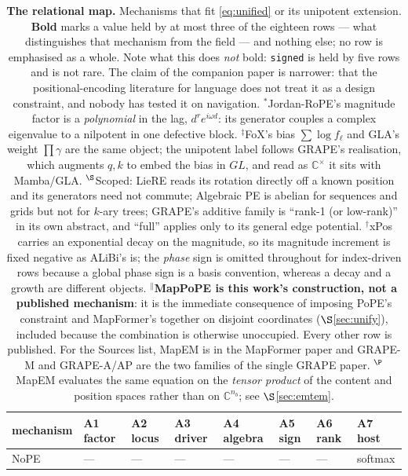\documentclass[11pt]{article}
\newcommand{\C}{\mathbb{C}}
\newcommand{\nb}{n_b}
\begin{document}
\begin{table}\small
\centering
\caption{\textbf{The relational map.} Mechanisms that fit \eqref{eq:unified} or its unipotent extension. \textbf{Bold} marks a value held by at most three of the eighteen rows --- what distinguishes that mechanism from the field --- and nothing else; no row is emphasised as a whole. Note what this does \emph{not} bold: \texttt{signed} is held by five rows and is not rare. The claim of the companion paper is narrower: that the positional-encoding literature for language does not treat it as a design constraint, and nobody has tested it on navigation.
$^\ast$Jordan-RoPE's magnitude factor is a \emph{polynomial} in the lag,
$d^re^{i\omega d}$: its generator couples a complex eigenvalue to a nilpotent in one
defective block. $^\ddagger$FoX's bias $\sum\log f_\ell$ and GLA's weight
$\prod\gamma$ are the same object; the unipotent label follows GRAPE's realisation,
which augments $q,k$ to embed the bias in $GL$, and read as $\C^\times$ it sits with
Mamba/GLA. $^{\S}$Scoped: LieRE reads its rotation directly off a known position and
its generators need not commute; Algebraic PE is abelian for sequences and grids but
not for $k$-ary trees; GRAPE's additive family is ``rank-1 (or low-rank)'' in its own
abstract, and ``full'' applies only to its general edge potential. $^{\dagger}$xPos carries an exponential decay on the magnitude, so its magnitude increment is fixed negative as ALiBi's is; the \emph{phase} sign is omitted throughout for index-driven rows because a global phase sign is a basis convention, whereas a decay and a growth are different objects. $^{\parallel}$\textbf{MapPoPE is this work's construction, not a published mechanism}: it is the immediate consequence of imposing PoPE's constraint and MapFormer's together on disjoint coordinates ($\S$\ref{sec:unify}), included because the combination is otherwise unoccupied. Every other row is published. For the Sources list, MapEM is in the MapFormer paper and GRAPE-M and GRAPE-A/AP are the two families of the single GRAPE paper. $^{\P}$MapEM evaluates the same
equation on the \emph{tensor product} of the content and position spaces rather
than on $\C^{\nb}$; see $\S$\ref{sec:emtem}.}
\begin{tabular}{llllllll}
\toprule
mechanism & A1 factor & A2 locus & A3 driver & A4 algebra & A5 sign & A6 rank & A7 host \\
\midrule
NoPE              & ---        & ---     & ---    & ---        & ---     & ---        & softmax \\

\end{tabular}
\end{table}
\end{document}
